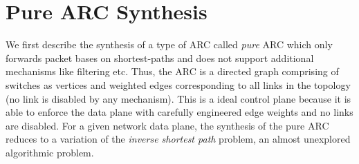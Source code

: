 


\section{Pure ARC Synthesis}
\label{sec:synthesis}
We first describe the synthesis of a type of ARC 
called {\em pure} ARC which
only forwards packet bases on shortest-paths and does 
not support additional mechanisms like filtering etc. 
Thus, 
the ARC is a directed graph comprising of switches as 
vertices and weighted edges corresponding to all links in the
topology (no link is disabled by any mechanism). 
This is 
a ideal control plane because it is able to enforce the data plane
with carefully engineered edge weights and no links are disabled. 
For a given network data plane, the synthesis of 
the pure ARC reduces to a
variation of the {\em inverse shortest path} problem, an almost 
unexplored algorithmic problem. 

